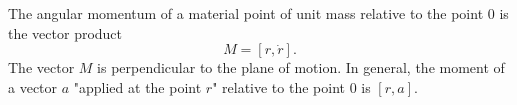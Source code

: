 The angular momentum of a material point of unit mass relative to the point $0$ is the vector product
$$M = [r, \dot{r}].$$
The vector $M$ is perpendicular to the plane of motion. In general, the moment of a vector $a$ "applied at the point $r$" relative to the point $0$ is $[r, a]$.
